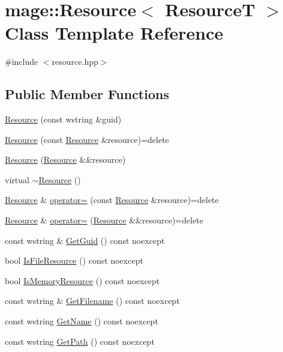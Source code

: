 \hypertarget{classmage_1_1_resource}{}\section{mage\+:\+:Resource$<$ ResourceT $>$ Class Template Reference}
\label{classmage_1_1_resource}


{\ttfamily \#include $<$resource.\+hpp$>$}

\subsection*{Public Member Functions}
\begin{DoxyCompactItemize}
\item 
\hyperlink{classmage_1_1_resource_a4a3302689084a35e8c857953709691be}{Resource} (const wstring \&guid)
\item 
\hyperlink{classmage_1_1_resource_a53da586d9bae285ab50c4cca2421a9ce}{Resource} (const \hyperlink{classmage_1_1_resource}{Resource} \&resource)=delete
\item 
\hyperlink{classmage_1_1_resource_a86216fd0f8072285ad1582e296a8a3fc}{Resource} (\hyperlink{classmage_1_1_resource}{Resource} \&\&resource)
\item 
virtual \hyperlink{classmage_1_1_resource_a56a3ac799224e100b271b65ec455b59e}{$\sim$\+Resource} ()
\item 
\hyperlink{classmage_1_1_resource}{Resource} \& \hyperlink{classmage_1_1_resource_a938159cb02ec565b9b957f993db4769d}{operator=} (const \hyperlink{classmage_1_1_resource}{Resource} \&resource)=delete
\item 
\hyperlink{classmage_1_1_resource}{Resource} \& \hyperlink{classmage_1_1_resource_aff0080e944136b1b0e889d4dd6cfb11f}{operator=} (\hyperlink{classmage_1_1_resource}{Resource} \&\&resource)=delete
\item 
const wstring \& \hyperlink{classmage_1_1_resource_adaa2464cb1fdb51a3f6028c0f316d083}{Get\+Guid} () const noexcept
\item 
bool \hyperlink{classmage_1_1_resource_a5995b6f8a2b0193a50255d082ae56af8}{Is\+File\+Resource} () const noexcept
\item 
bool \hyperlink{classmage_1_1_resource_af7b0f0c75c9bac9b7b0dc3daec832cbd}{Is\+Memory\+Resource} () const noexcept
\item 
const wstring \& \hyperlink{classmage_1_1_resource_a21bed60ba52a741eaffddc953f241be7}{Get\+Filename} () const noexcept
\item 
const wstring \hyperlink{classmage_1_1_resource_a7e056c97f70a3f7211d9456bbda51010}{Get\+Name} () const noexcept
\item 
const wstring \hyperlink{classmage_1_1_resource_a9df55cc00e0412b1435538e8107ee563}{Get\+Path} () const noexcept
\end{DoxyCompactItemize}
